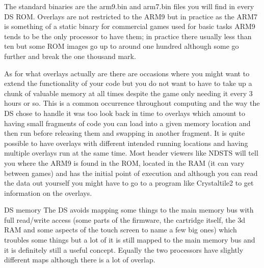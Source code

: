 \documentclass[
]{book}
\begin{document}
The standard binaries are the arm9.bin and arm7.bin files you will find in every DS ROM. Overlays are not restricted to the ARM9 but in practice as the ARM7 is something of a static binary for commercial games used for basic tasks ARM9 tends to be the only processor to have them; in practice there usually less than ten but some ROM images go up to around one hundred although some go further and break the one thousand mark.

As for what overlays actually are there are occasions where you might want to extend the functionality of your code but you do not want to have to take up a chunk of valuable memory at all times despite the game only needing it every 3 hours or so. This is a common occurrence throughout computing and the way the DS chose to handle it was too look back in time to overlays which amount to having small fragments of code you can load into a given memory location and then run before releasing them and swapping in another fragment. It is quite possible to have overlays with different intended running locations and having multiple overlays run at the same time. Most header viewers like NDSTS will tell you where the ARM9 is found in the ROM, located in the RAM (it can vary between games) and has the initial point of execution and although you can read the data out yourself you might have to go to a program like Crystaltile2 to get information on the overlays.

DS memory The DS avoids mapping some things to the main memory bus with full read/write access (some parts of the firmware, the cartridge itself, the 3d RAM and some aspects of the touch screen to name a few big ones) which troubles some things but a lot of it is still mapped to the main memory bus and it is definitely still a useful concept. Equally the two processors have slightly different maps although there is a lot of overlap.
\end{document}
